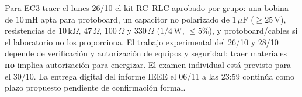 \documentclass[11pt, a4paper]{article}
\begin{document}
\begin{tcolorbox}[colback=warnred!5!white, colframe=warnred, title=\textbf{Comunicado Oficial para Estudiantes (Emisión Docente)}]
\small\RaggedRight
Para EC3 traer el lunes 26/10 el kit RC–RLC aprobado por grupo: una bobina de $10\,\text{mH}$ apta para protoboard, un capacitor no polarizado de $1\,\mu\text{F}$ ($\ge 25\,\text{V}$), resistencias de $10\,\text{k}\Omega$, $47\,\Omega$, $100\,\Omega$ y $330\,\Omega$ ($1/4\,\text{W}$, $\le 5\%$), y protoboard/cables si el laboratorio no los proporciona. El trabajo experimental del 26/10 y 28/10 depende de verificación y autorización de equipos y seguridad; traer materiales \textbf{no} implica autorización para energizar. El examen individual está previsto para el 30/10. La entrega digital del informe IEEE el 06/11 a las 23:59 continúa como plazo propuesto pendiente de confirmación formal.
\end{tcolorbox}
\end{document}
